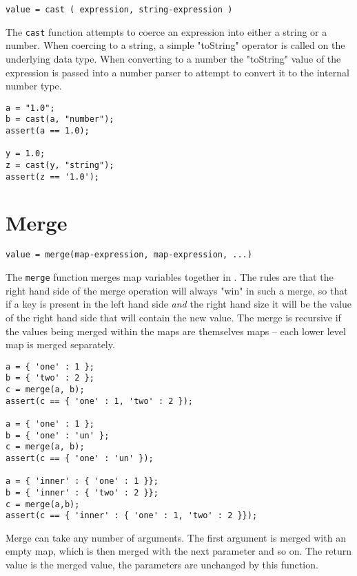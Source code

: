 \begin{Verbatim}
value = cast ( expression, string-expression )
\end{Verbatim}

The \Verb+cast+ function attempts to coerce an expression into either a string or a number. When coercing to a string, a simple "toString" operator is called on the underlying data type. When converting to a number the "toString" value of the expression is passed into a number parser to attempt to convert it to the internal \Reflex number type.

\begin{lstlisting}[caption={Cast example}]
a = "1.0";
b = cast(a, "number");
assert(a == 1.0);

y = 1.0;
z = cast(y, "string");
assert(z == '1.0');

\end{lstlisting}

\section{Merge}
\begin{Verbatim}
value = merge(map-expression, map-expression, ...)
\end{Verbatim}

The \Verb+merge+ function merges map variables together in \Reflex. The rules are that the right hand side of the merge operation will always "win" in such a merge, so that if a key is present in the left hand side \emph{and} the right hand size it will be the value of the right hand side that will contain the new value. The merge is recursive if the values being merged within the maps are themselves maps -- each lower level map is merged separately.

\begin{lstlisting}[caption={Merge example}]
a = { 'one' : 1 };
b = { 'two' : 2 };
c = merge(a, b);
assert(c == { 'one' : 1, 'two' : 2 });

a = { 'one' : 1 };
b = { 'one' : 'un' };
c = merge(a, b);
assert(c == { 'one' : 'un' });

a = { 'inner' : { 'one' : 1 }};
b = { 'inner' : { 'two' : 2 }};
c = merge(a,b);
assert(c == { 'inner' : { 'one' : 1, 'two' : 2 }});

\end{lstlisting}

Merge can take any number of arguments. The first argument is merged with an empty map, which is then merged with the next parameter and so on. The return value is the merged value, the parameters are unchanged by this function.

